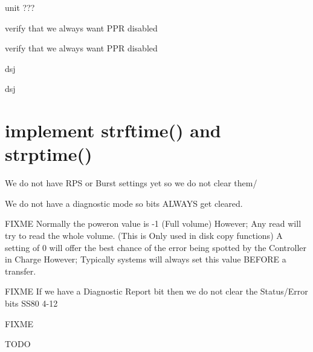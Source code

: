 \begin{DoxyRefList}
unit ???  
\item[\label{todo__todo000002}%
\hypertarget{todo__todo000002}{}%
Global \hyperlink{amigo_8h_ab63435382919a7106a374b021861a2e1}{amigo\+\_\+init} (void)]verify that we always want P\+PR disabled  
\item[\label{todo__todo000002}%
\hypertarget{todo__todo000002}{}%
Global \hyperlink{amigo_8h_ab63435382919a7106a374b021861a2e1}{amigo\+\_\+init} (void)]verify that we always want P\+PR disabled  
\item[\label{todo__todo000003}%
\hypertarget{todo__todo000003}{}%
Global \hyperlink{amigo_8h_afb2f0c0517c5c10c38f8e15b8b281a8c}{amigo\+\_\+request\+\_\+status} (void)]dsj  
\item[\label{todo__todo000003}%
\hypertarget{todo__todo000003}{}%
Global \hyperlink{amigo_8h_afb2f0c0517c5c10c38f8e15b8b281a8c}{amigo\+\_\+request\+\_\+status} (void)]dsj  
\item[\label{todo__todo000001}%
\hypertarget{todo__todo000001}{}%
Global \hyperlink{time_8h_a7ffc52def0c7fbf70c50248e3f7d6a8a}{asctime\+\_\+r} (tm\+\_\+t $\ast$t, char $\ast$buf)]\section*{implement strftime() and strptime() }


\item[\label{todo__todo000056}%
\hypertarget{todo__todo000056}{}%
Global \hyperlink{ss80_8h_aa48ccb1479e226dacfaa1dac15631a9d}{Clear\+\_\+\+Common} (int u)]We do not have R\+PS or Burst settings yet so we do not clear them/ 

We do not have a diagnostic mode so bits A\+L\+W\+A\+YS get cleared. 

F\+I\+X\+ME Normally the poweron value is -\/1 (Full volume) However; Any read will try to read the whole volume. (This is Only used in disk copy functions) A setting of 0 will offer the best chance of the error being spotted by the Controller in Charge However; Typically systems will always set this value B\+E\+F\+O\+RE a transfer. 

F\+I\+X\+ME If we have a Diagnostic Report bit then we do not clear the Status/\+Error bits S\+S80 4-\/12  
\item[\label{todo__todo000063}%
\hypertarget{todo__todo000063}{}%
Global \hyperlink{fatfs__utils_8h_a97a2409a53057e1a63537f196ff00a50}{fatfs\+\_\+cat} (char $\ast$name)]F\+I\+X\+ME  
\item[\label{todo__todo000015}%
\hypertarget{todo__todo000015}{}%
Global \hyperlink{gpib__task_8h_ac63d4e431ab55dddfbf436d87135128e}{G\+P\+IB} (uint8\+\_\+t ch)]T\+O\+DO 


\end{DoxyRefList}
